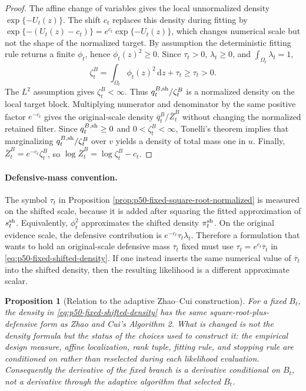 \documentclass[11pt]{article}
\newtheorem{proposition}{Proposition}
\numberwithin{equation}{section}
\newcommand{\dd}{\,\mathrm d}
\begin{document}
\begin{proof}
The affine change of variables gives the local unnormalized density
\(\exp\{-U_t(z)\}\).  The shift \(c_t\) replaces this density during fitting by
\(\exp\{-(U_t(z)-c_t)\}=e^{c_t}\exp\{-U_t(z)\}\), which changes numerical scale
but not the shape of the normalized target.  By assumption the deterministic
fitting rule returns a finite \(\phi_t\), hence \(\phi_t(z)^2\ge0\).  Since
\(\tau_t>0\), \(\lambda_t\ge0\), and \(\int_{\Omega_t}\lambda_t=1\),
\[
    \zeta_t^B
    =
    \int_{\Omega_t}\phi_t(z)^2\dd z+\tau_t
    \ge \tau_t>0.
\]
The \(L^2\) assumption gives \(\zeta_t^B<\infty\).  Thus
\(q_t^{B,{\rm sh}}/\zeta_t^B\) is a normalized density on the local target
block.  Multiplying numerator and denominator by the same positive factor
\(e^{-c_t}\) gives the original-scale density
\(\overline q_t^B/\overline Z_t^B\) without changing the normalized retained
filter.  Since \(q_t^{B,{\rm sh}}\ge0\) and \(0<\zeta_t^B<\infty\), Tonelli's
theorem implies that marginalizing \(q_t^{B,{\rm sh}}/\zeta_t^B\) over \(v\)
yields a density of total mass one in \(u\).  Finally,
\(\overline Z_t^B=e^{-c_t}\zeta_t^B\), so
\(\log\overline Z_t^B=\log\zeta_t^B-c_t\).
\end{proof}

\paragraph{Defensive-mass convention.}
The symbol \(\tau_t\) in Proposition
\ref{prop:p50-fixed-square-root-normalized} is measured on the shifted scale,
because it is added after squaring the fitted approximation of
\(s_t^{\rm sh}\).  Equivalently, \(\phi_t^2\) approximates the shifted density
\(\pi_t^{\rm sh}\).  On the original evidence scale, the defensive
contribution is \(e^{-c_t}\tau_t\lambda_t\).  Therefore a formulation that
wants to hold an original-scale defensive mass \(\overline\tau_t\) fixed must use
\(\tau_t=e^{c_t}\overline\tau_t\) in \eqref{eq:p50-fixed-shifted-density}.  If
one instead inserts the same numerical value of \(\overline\tau_t\) into the
shifted density, then the resulting likelihood is a different approximate
scalar.

\begin{proposition}[Relation to the adaptive Zhao--Cui construction]
\label{prop:p50-fixed-adaptive-relation}
For a fixed \(B_t\), the density in
\eqref{eq:p50-fixed-shifted-density} has the same square-root-plus-defensive
form as Zhao and Cui's Algorithm 2.  What is changed is not the density formula
but the status of the choices used to construct it: the empirical design
measure, affine localization, rank tuple, fitting rule, and stopping rule are
conditioned on rather than reselected during each likelihood evaluation.
Consequently the derivative of the fixed branch is a derivative conditional on
\(B_t\), not a derivative through the adaptive algorithm that selected \(B_t\).
\end{proposition}
\end{document}
